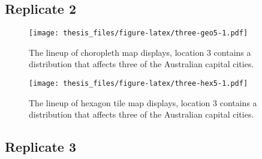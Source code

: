 \documentclass{monashthesis}
\begin{document}
\hypertarget{replicate-2-1}{%
\subsection{Replicate 2}\label{replicate-2-1}}

\begin{Shaded}
\begin{Highlighting}[]
\NormalTok{() }\OperatorTok{+}
\StringTok{  }\NormalTok{(}\NormalTok{(}\NormalTok{(}\NormalTok{)))}
\end{Highlighting}
\end{Shaded}

\begin{figure}
\centering
\texttt{[image: thesis\_files/figure-latex/three-geo5-1.pdf]}
\caption{\label{fig:three-geo5}The lineup of choropleth map displays, location 3 contains a distribution that affects three of the Australian capital cities.}
\end{figure}

\begin{Shaded}
\begin{Highlighting}[]
\NormalTok{() }\OperatorTok{+}
\StringTok{  }\NormalTok{(}\NormalTok{(}\NormalTok{(}\NormalTok{)))}
\end{Highlighting}
\end{Shaded}

\begin{figure}
\centering
\texttt{[image: thesis\_files/figure-latex/three-hex5-1.pdf]}
\caption{\label{fig:three-hex5}The lineup of hexagon tile map displays, location 3 contains a distribution that affects three of the Australian capital cities.}
\end{figure}

\hypertarget{replicate-3-1}{%
\subsection{Replicate 3}\label{replicate-3-1}}

\begin{Shaded}
\begin{Highlighting}[]
\NormalTok{() }\OperatorTok{+}
\StringTok{  }\NormalTok{(}\NormalTok{(}\NormalTok{(}\NormalTok{)))}
\end{Highlighting}
\end{Shaded}
\end{document}
